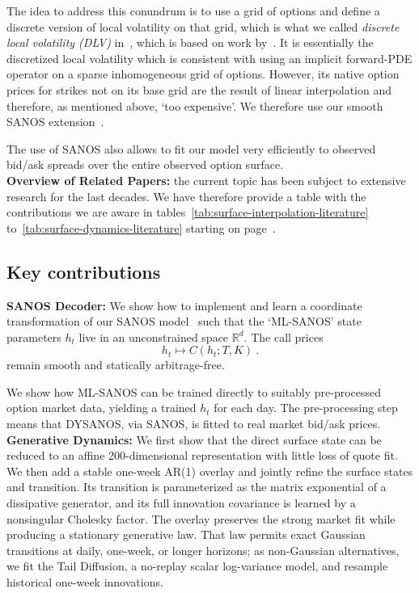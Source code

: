 \documentclass[11pt,a4paper]{article}
\newcommand{\R}{\mathbb{R}}
\begin{document}
The idea to address this conundrum is to use a grid of options and define a discrete version
of local volatility on that grid, which is what we called
\emph{discrete local volatility (DLV)} in~\citet{DLV}, which is based on work by~\cite{AndreasenHuge}.
It is essentially the discretized local volatility which is consistent with using an implicit forward-PDE operator on a sparse inhomogeneous grid of options.
However,
its native option prices for strikes not on its base grid are the result of linear interpolation and therefore, as mentioned above, `too expensive'.
We therefore use
our smooth SANOS extension~\citep{SANOS2026}.

The use of SANOS also allows to fit our model very efficiently to observed bid/ask spreads over the entire observed option surface.\\

\noindent
\textbf{Overview of Related Papers:} the current topic has been subject to extensive research for the last decades.
We have therefore provide a table with the contributions we are aware in tables~\ref{tab:surface-interpolation-literature} to~\ref{tab:surface-dynamics-literature}
starting on page~\pageref{tab:surface-interpolation-literature}.

\subsection*{Key contributions}

\noindent
\textbf{SANOS Decoder:}
    We show how to implement and learn a coordinate transformation of
    our SANOS model~\citep{SANOS2026}
    such that the `ML-SANOS' state parameters $h_t$ live in an unconstrained space
    $\R^{d}$.  The call
    prices 
    $$
        h_t \longmapsto C(h_t;T,K)  \ .
    $$    
    remain smooth and statically arbitrage-free.
    
    We show how ML-SANOS can be trained directly to suitably pre-processed 
    option market data, yielding a trained $h_t$ for each day.
    The pre-processing step means that DYSANOS, via SANOS, is fitted to real market bid/ask prices.\\

\noindent
\textbf{Generative Dynamics:}
    We first show that the direct surface state can be reduced to an
    affine 200-dimensional representation with little loss of quote fit.  We
    then add a stable one-week AR(1) overlay and jointly refine the surface
    states and transition.  Its transition is parameterized as the matrix
    exponential of a dissipative generator, and its full innovation
    covariance is learned by a nonsingular Cholesky factor.  The overlay
    preserves the strong market fit while producing a stationary generative
    law.  That law permits exact Gaussian transitions at daily, one-week, or
    longer horizons; as non-Gaussian alternatives, we fit the Tail Diffusion,
    a no-replay scalar log-variance model, and resample historical one-week
    innovations.
    
\end{document}
